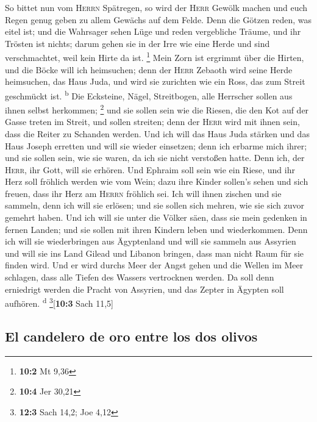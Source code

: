  So bittet nun vom \textsc{Herrn} Spätregen, so wird der
\textsc{Herr} Gewölk machen und euch Regen genug geben zu allem Gewächs
auf dem Felde.  Denn die Götzen reden, was eitel ist; und
die Wahrsager sehen Lüge und reden vergebliche Träume, und ihr Trösten
ist nichts; darum gehen sie in der Irre wie eine Herde und sind
verschmachtet, weil kein Hirte da ist. \footnote{\textbf{10:2} Mt 9,36}
 Mein Zorn ist ergrimmt über die Hirten, und die Böcke
will ich heimsuchen; denn der \textsc{Herr} Zebaoth wird seine Herde
heimsuchen, das Haus Juda, und wird sie zurichten wie ein Ross, das zum
Streit geschmückt ist. \textsuperscript{b}  Die Ecksteine,
Nägel, Streitbogen, alle Herrscher sollen aus ihnen selbst herkommen;
\footnote{\textbf{10:4} Jer 30,21}  und sie sollen sein
wie die Riesen, die den Kot auf der Gasse treten im Streit, und sollen
streiten; denn der \textsc{Herr} wird mit ihnen sein, dass die Reiter zu
Schanden werden.  Und ich will das Haus Juda stärken und
das Haus Joseph erretten und will sie wieder einsetzen; denn ich erbarme
mich ihrer; und sie sollen sein, wie sie waren, da ich sie nicht
verstoßen hatte. Denn ich, der \textsc{Herr}, ihr Gott, will sie
erhören.  Und Ephraim soll sein wie ein Riese, und ihr
Herz soll fröhlich werden wie vom Wein; dazu ihre Kinder sollen's sehen
und sich freuen, dass ihr Herz am \textsc{Herrn} fröhlich sei.
 Ich will ihnen zischen und sie sammeln, denn ich will sie
erlösen; und sie sollen sich mehren, wie sie sich zuvor gemehrt haben.
 Und ich will sie unter die Völker säen, dass sie mein
gedenken in fernen Landen; und sie sollen mit ihren Kindern leben und
wiederkommen.  Denn ich will sie wiederbringen aus
Ägyptenland und will sie sammeln aus Assyrien und will sie ins Land
Gilead und Libanon bringen, dass man nicht Raum für sie finden wird.
 Und er wird durchs Meer der Angst gehen und die Wellen
im Meer schlagen, dass alle Tiefen des Wassers vertrocknen werden. Da
soll denn erniedrigt werden die Pracht von Assyrien, und das Zepter in
Ägypten soll aufhören. \textsuperscript{d} \footnote{\textbf{12:3} Sach
  14,2; Joe 4,12}{[}\textbf{10:3} Sach 11,5{]}

\hypertarget{el-candelero-de-oro-entre-los-dos-olivos}{%
\subsection{El candelero de oro entre los dos
olivos}\label{el-candelero-de-oro-entre-los-dos-olivos}}

